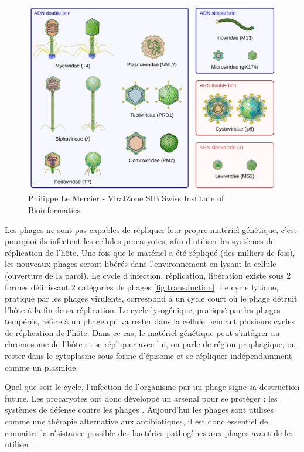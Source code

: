 \begin{figure}[htbp]
    \centering
    \includegraphics[width=0.75\linewidth]{images/phages.png}
    \caption[Diversité morphologique parmi les phages]{Philippe Le Mercier - ViralZone SIB Swiss Institute of Bioinformatics}
    \label{fig:phages}
\end{figure}

Les phages ne sont pas capables de répliquer leur propre matériel génétique, c'est pourquoi ils infectent les cellules procaryotes, afin d'utiliser les systèmes de réplication de l'hôte. Une fois que le matériel a été répliqué (des milliers de fois), les nouveaux phages seront libérés dans l'environnement en lysant la cellule (ouverture de la paroi). Le cycle d'infection, réplication, libération existe sous 2 formes définissant 2 catégories de phages \autoref{fig:transduction}. Le cycle lytique, pratiqué par les phages virulents, correspond à un cycle court où le phage détruit l'hôte à la fin de sa réplication. Le cycle lysogénique, pratiqué par les phages tempérés, réfère à un phage qui va rester dans la cellule pendant plusieurs cycles de réplication de l'hôte. Dans ce cas, le matériel génétique peut s'intégrer au chromosome de l'hôte et se répliquer avec lui, on parle de région prophagique, ou rester dans le cytoplasme sous forme d'épisome et se répliquer indépendamment comme un plasmide.

Quel que soit le cycle, l'infection de l'organisme par un phage signe sa destruction future. Les procaryotes ont donc développé un arsenal pour se protéger : les systèmes de défense contre les phages \cite{makarova_comparative_2013}. Aujourd'hui les phages sont utilisés comme une thérapie alternative aux antibiotiques, il est donc essentiel de connaitre la résistance possible des bactéries pathogènes aux phages avant de les utiliser \cite{cui_current_2024}.

